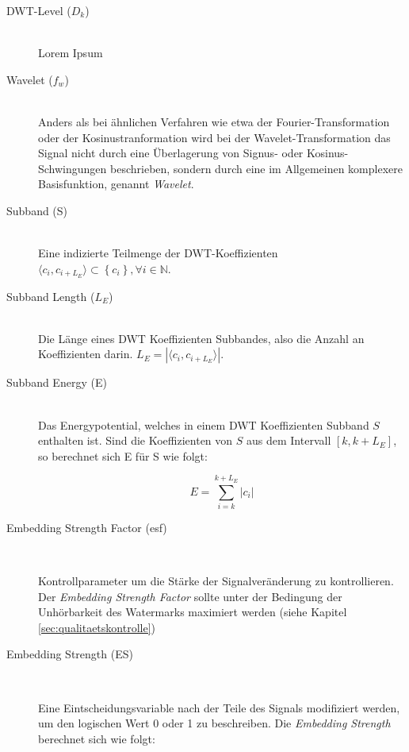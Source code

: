 \begin{description}
\item[DWT-Level (${D}_{k}$)] \hfill \\
Lorem Ipsum

\item[Wavelet (${f}_{w}$)] \hfill \\
Anders als bei \"ahnlichen Verfahren wie etwa der Fourier-\-Transformation oder der Kosinus\-tranformation wird bei der Wavelet-Transformation das Signal nicht durch eine Überlagerung von Signus- oder Kosinus-Schwingungen beschrieben, sondern durch eine im Allgemeinen komplexere Basisfunktion, genannt \textit{Wavelet}.
	
\item[Subband (S)] \hfill \\ 
Eine indizierte Teilmenge der DWT-Koeffizienten $\langle{c}_{i},{c}_{i+{L}_{E}}\rangle \subset \left\{{c}_{i}\right\}, \forall i \in \mathbb{N}$. 
	
\item[Subband Length (${L}_{E}$)] \hfill \\
Die L\"ange eines DWT Koeffizienten Subbandes, also die Anzahl an Koeffizienten darin. ${L}_{E} = |\langle{c}_{i},{c}_{i+{L}_{E}}\rangle|$.

\item[Subband Energy (E)] \hfill \\
Das Energypotential, welches in einem DWT Koeffizienten Subband $S$ enthalten ist. Sind die Koeffizienten von $S$ aus dem Intervall $[k, k+{L}_{E}]$, so berechnet sich E f\"ur S wie folgt:
	
	\begin{equation}
		E = \sum\limits_{i=k}^{k+{L}_{E}}|c_i| \label{equ:energy}
	\end{equation}
	
\item[Embedding Strength Factor (esf)] \hfill \\

Kontrollparameter um die Stärke der Signalveränderung zu kontrollieren. Der \textit{Embedding Strength Factor} sollte unter der Bedingung der Unhörbarkeit des Watermarks maximiert werden (siehe Kapitel \ref{sec:qualitaetskontrolle})
	
\item[Embedding Strength (ES)] \hfill \\

Eine Eintscheidungsvariable nach der Teile des Signals modifiziert werden, um den logischen Wert 0 oder 1 zu beschreiben. Die \textit{Embedding Strength} berechnet sich wie folgt:


\end{description}
